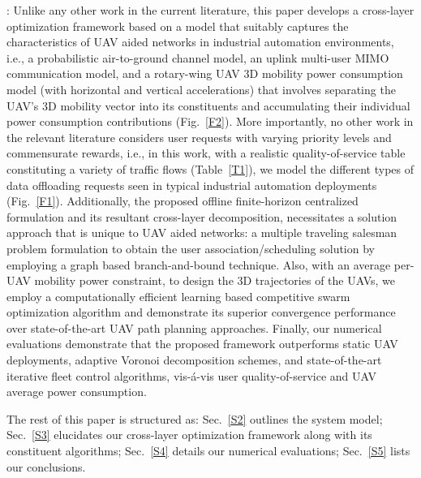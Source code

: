 \documentclass[10pt, twocolumn]{IEEEtran}
\begin{document}
: Unlike any other work in the current literature, this paper develops a cross-layer optimization framework based on a model that suitably captures the characteristics of UAV aided networks in industrial automation environments, i.e., a probabilistic air-to-ground channel model, an uplink multi-user MIMO communication model, and a rotary-wing UAV $3$D mobility power consumption model (with horizontal and vertical accelerations) that involves separating the UAV's $3$D mobility vector into its constituents and accumulating their individual power consumption contributions (Fig.~\ref{F2}). More importantly, no other work in the relevant literature considers user requests with varying priority levels and commensurate rewards, i.e., in this work, with a realistic quality-of-service table constituting a variety of traffic flows (Table~\ref{T1}), we model the different types of data offloading requests seen in typical industrial automation deployments (Fig.~\ref{F1}). Additionally, the proposed offline finite-horizon centralized formulation and its resultant cross-layer decomposition, necessitates a solution approach that is unique to UAV aided networks: a multiple traveling salesman problem formulation to obtain the user association/scheduling solution by employing a graph based branch-and-bound technique. Also, with an average per-UAV mobility power constraint, to design the $3$D trajectories of the UAVs, we employ a computationally efficient learning based competitive swarm optimization algorithm and demonstrate its superior convergence performance over state-of-the-art UAV path planning approaches. Finally, our numerical evaluations demonstrate that the proposed framework outperforms static UAV deployments, adaptive Voronoi decomposition schemes, and state-of-the-art iterative fleet control algorithms, vis-\'{a}-vis user quality-of-service and UAV average power consumption.

The rest of this paper is structured as: Sec.~\ref{S2} outlines the system model; Sec.~\ref{S3} elucidates our cross-layer optimization framework along with its constituent algorithms; Sec.~\ref{S4} details our numerical evaluations; Sec.~\ref{S5} lists our conclusions.
\vspace{-8mm}

\end{document}
